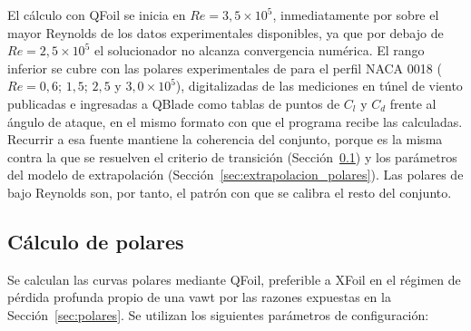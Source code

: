El cálculo con QFoil se inicia en $Re = 3{,}5 \times 10^5$, inmediatamente por sobre el mayor Reynolds de los datos experimentales disponibles, ya que por debajo de $Re = 2{,}5 \times 10^5$ el solucionador no alcanza convergencia numérica. El rango inferior se cubre con las polares experimentales de \textcite{Bianchini2015} para el perfil NACA 0018 ($Re = 0{,}6$; $1{,}5$; $2{,}5$ y $3{,}0 \times 10^5$), digitalizadas de las mediciones en túnel de viento publicadas e ingresadas a QBlade como tablas de puntos de $C_l$ y $C_d$ frente al ángulo de ataque, en el mismo formato con que el programa recibe las calculadas. Recurrir a esa fuente mantiene la coherencia del conjunto, porque es la misma contra la que se resuelven el criterio de transición (Sección~\ref{sec:calculo_polares}) y los parámetros del modelo de extrapolación (Sección~\ref{sec:extrapolacion_polares}). Las polares de bajo Reynolds son, por tanto, el patrón con que se calibra el resto del conjunto.


\subsection{Cálculo de polares}
\label{sec:calculo_polares}

Se calculan las curvas polares mediante QFoil, preferible a XFoil en el régimen de pérdida profunda propio de una \gls{vawt} por las razones expuestas en la Sección~\ref{sec:polares}. Se utilizan los siguientes parámetros de configuración:

